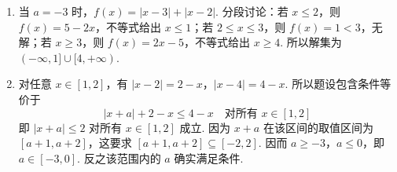 \begin{solution}
\begin{enumerate}
\item 当 \(a=-3\) 时，\(f(x)=|x-3|+|x-2|\). 分段讨论：若 \(x\leqslant2\)，则 \(f(x)=5-2x\)，不等式给出 \(x\leqslant1\)；若 \(2\leqslant x\leqslant3\)，则 \(f(x)=1<3\)，无解；若 \(x\geqslant3\)，则 \(f(x)=2x-5\)，不等式给出 \(x\geqslant4\). 所以解集为 \((-\infty,1]\cup[4,+\infty)\).
\item 对任意 \(x\in[1,2]\)，有 \(|x-2|=2-x\)，\(|x-4|=4-x\). 所以题设包含条件等价于
\[
|x+a|+2-x\leqslant4-x\quad\text{对所有 }x\in[1,2]
\]
即 \(|x+a|\leqslant2\) 对所有 \(x\in[1,2]\) 成立. 因为 \(x+a\) 在该区间的取值区间为 \([a+1,a+2]\)，这要求 \([a+1,a+2]\subseteq[-2,2]\). 因而 \(a\geqslant-3\)，\(a\leqslant0\)，即 \(a\in[-3,0]\). 反之该范围内的 \(a\) 确实满足条件.
\end{enumerate}
\end{solution}
